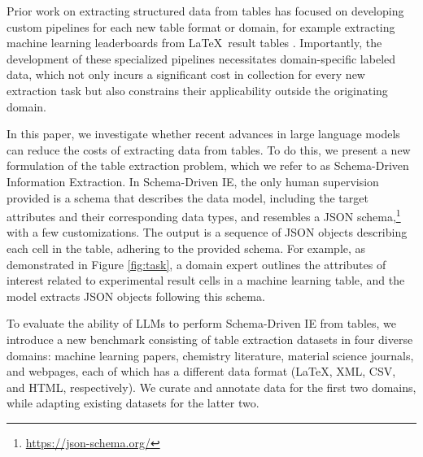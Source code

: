 \documentclass[11pt]{article}
\begin{document}
Prior work on extracting structured data from tables has focused on developing custom pipelines for each new table format or domain, for example extracting machine learning leaderboards from \LaTeX~result tables \cite{kardas-etal-2020-axcell}. 
Importantly, the development of these specialized pipelines necessitates domain-specific labeled data, which not only incurs a significant cost in collection for every new extraction task but also constrains their applicability outside the originating domain.





In this paper, we investigate whether recent advances in large language models can reduce the costs of extracting data from tables.  To do this, we present a new formulation of the table extraction problem, which we refer to as Schema-Driven Information Extraction. 
In Schema-Driven IE, the only human supervision provided is a schema that describes the data model, including the target attributes and their corresponding data types, and resembles a JSON schema,\footnote{\url{https://json-schema.org/}} with a few customizations. 
The output is a sequence of JSON objects describing each cell in the table, adhering to the provided schema.
For example, as demonstrated in Figure \ref{fig:task}, a domain expert outlines the attributes of interest related to experimental result cells in a machine learning table, and the model extracts JSON objects following this schema. 








To evaluate the ability of LLMs to perform Schema-Driven IE from tables, we introduce a new benchmark consisting of table extraction datasets in four diverse domains: machine learning papers, chemistry literature, material science journals, and webpages, each of which has a different data format (\LaTeX, XML, CSV, and HTML, respectively). We curate and annotate data for the first two domains, while adapting existing datasets for the latter two. 
\end{document}
